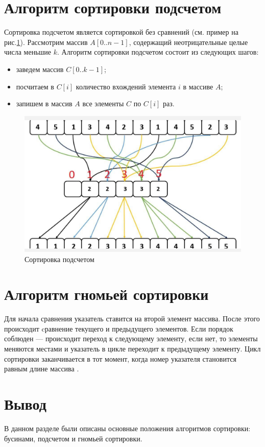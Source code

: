 \section{Алгоритм сортировки подсчетом}

Сортировка подсчетом является сортировкой без сравнений (см. пример на рис.\ref{img:counting_sort_fig}).
Рассмотрим массив $A[0..n-1]$, содержащий
неотрицательные целые числа меньшие $k$.
Алгоритм сортировки подсчетом состоит из следующих шагов:
\begin{itemize}
	\item заведем массив $C[0..k-1]$;
	\item посчитаем в $C[i]$ количество вхождений элемента $i$ в массиве $A$;
	\item запишем в массив $A$ все элементы $C$ по $C[i]$ раз.
\end{itemize}

\begin{figure}[H]
	\begin{center}
		\includegraphics[scale=0.4]{img/counting_sort_fig.png}
	\end{center}
	\captionsetup{justification=centering}
	\caption{Сортировка подсчетом}
	\label{img:counting_sort_fig}
\end{figure}


\section{Алгоритм гномьей сортировки}

Для начала сравнения указатель ставится на второй элемент
массива. После этого происходит cравнение текущего и предыдущего элементов. Если порядок соблюден --- происходит переход к следующему элементу, если нет, то элементы меняются местами и указатель в цикле переходит к предыдущему элементу. Цикл сортировки заканчивается в тот момент, когда номер указателя становится равным длине массива \cite{gnome_sort}.


\section*{Вывод}

В данном разделе были описаны основные положения алгоритмов сортировки: бусинами, подсчетом и гномьей сортировки.